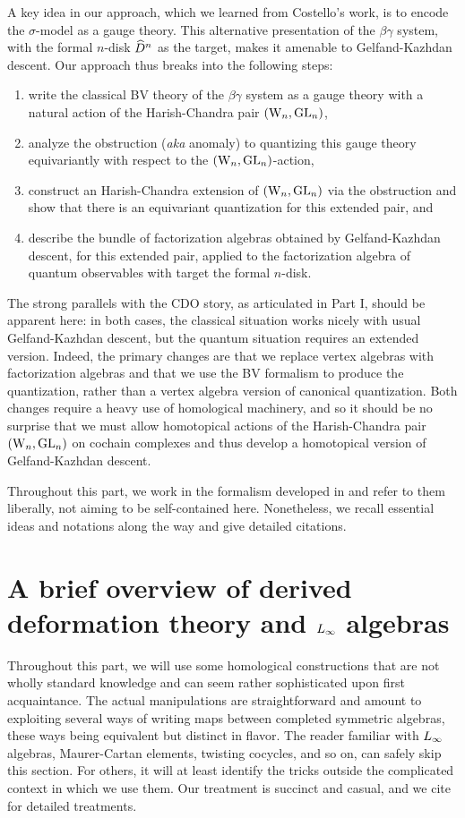 A key idea in our approach, which we learned from Costello's work, is to encode the $\sigma$-model as a gauge theory. 
This alternative presentation of the $\beta\gamma$ system, with the formal $n$-disk $\widehat{D}^n$ as the target,
makes it amenable to Gelfand-Kazhdan descent.
Our approach thus breaks into the following steps:
\begin{enumerate}
\item write the classical BV theory of the $\beta\gamma$ system as a gauge theory with a natural action of the Harish-Chandra pair $({{\rm W}_n},{\rm GL}_n)$,
\item analyze the obstruction ({\em aka} anomaly) to quantizing this gauge theory equivariantly with respect to the $({{\rm W}_n},{\rm GL}_n)$-action,
\item construct an Harish-Chandra extension of $({{\rm W}_n},{\rm GL}_n)$ via the obstruction and show that there is an equivariant quantization for this extended pair, and
\item describe the bundle of factorization algebras obtained by
  Gelfand-Kazhdan descent, for this extended pair, applied to the
  factorization algebra of quantum observables with target the formal $n$-disk.
\end{enumerate}
The strong parallels with the CDO story, as articulated in Part I, should be apparent here: 
in both cases, the classical situation works nicely with usual Gelfand-Kazhdan descent, but the quantum situation requires an extended version.
Indeed, the primary changes are that we replace vertex algebras with factorization algebras and that we use the BV formalism to produce the quantization, rather than a vertex algebra version of canonical quantization.
Both changes require a heavy use of homological machinery, and so it should be no surprise that we must allow homotopical actions of the Harish-Chandra pair $({{\rm W}_n},{\rm GL}_n)$ on cochain complexes and thus develop a homotopical version of Gelfand-Kazhdan descent.

Throughout this part, we work in the formalism developed in \cite{CosBook,CG}
and refer to them liberally, not aiming to be self-contained here.
Nonetheless, we recall essential ideas and notations along the way and give detailed citations.

\section{A brief overview of derived deformation theory and $\L8$ algebras}
\label{sec DDT}

Throughout this part, we will use some homological constructions 
that are not wholly standard knowledge and 
can seem rather sophisticated upon first acquaintance.
The actual manipulations are straightforward and 
amount to exploiting several ways of writing maps between completed symmetric algebras, 
these ways being equivalent but distinct in flavor.
The reader familiar with $\L8$ algebras, Maurer-Cartan elements, twisting cocycles,
and so on, can safely skip this section.
For others, it will at least identify the tricks outside the complicated context in which we use them.
Our treatment is succinct and casual, and we cite \cite{LV, Hinich, LurieSAG, CG}
for detailed treatments.

